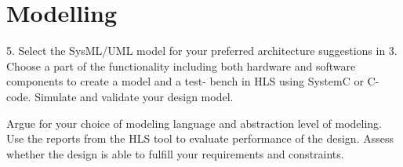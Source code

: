 \section{Modelling}

\begin{framed}
5. Select the SysML/UML model for your preferred architecture suggestions in 3. Choose a part of the functionality including both hardware and software components to create a model and a test- bench in HLS using SystemC or C-code. Simulate and validate your design model.

Argue for your choice of modeling language and abstraction level of modeling. Use the reports from the HLS tool to evaluate performance of the design. Assess whether the design is able to fulfill your requirements and constraints.
\end{framed}



